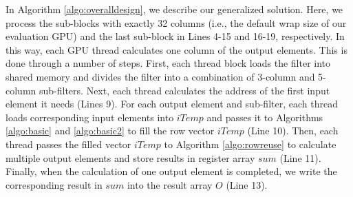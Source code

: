  In Algorithm \ref{algo:overalldesign}, we describe our generalized solution. Here, we process the sub-blocks with
exactly 32 columns (i.e., the default wrap size of our evaluation GPU) and the last sub-block in Lines 4-15 and 16-19, respectively. In
this way, each GPU thread calculates one column of the output elements. This is done through a number of steps. First, each thread block
loads the filter into shared memory and divides the filter into a combination of 3-column and 5-column sub-filters. Next, each thread
calculates the address of the first input element it needs (Lines 9). For each output element and sub-filter, each thread loads
corresponding input elements into $iTemp$ and passes it to Algorithms \ref{algo:basic} and \ref{algo:basic2} to fill the row vector $iTemp$
(Line 10). Then, each thread passes the filled vector $iTemp$ to Algorithm \ref{algo:rowreuse} to calculate multiple output elements and
store results in register array $sum$ (Line 11). Finally, when the calculation of one output element is completed, we write the
corresponding result in $sum$ into the result array $O$ (Line 13).

